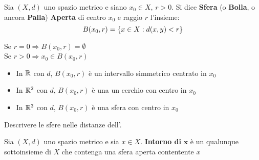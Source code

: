 \begin{definition}[Sfera]
	Sia $(X,d)$ uno spazio metrico e siano $x_0 \in X$, $r > 0$. Si dice \textbf{Sfera} (o \textbf{Bolla}, o ancora \textbf{Palla}) \textbf{Aperta} di centro $x_0$ e raggio $r$ l'insieme:
	\[B(x_0,r)=\left\{x\in X : d(x,y)<r\right\}\]
\end{definition}
\begin{observation}
	Se $r=0\Rightarrow B(x_0,r)=\emptyset$\\
	Se $r>0\Rightarrow x_0\in B(x_0,r)$
\end{observation}
\begin{example}\leavevmode\vspace*{-\baselineskip}
	\begin{itemize}
		\item In $\mathbb{R}$ con $d$, $B(x_0,r)$ è un intervallo simmetrico centrato in $x_0$
		\item In $\mathbb{R}^2$ con $d$, $B(x_0,r)$ è una un cerchio con centro in $x_0$
		\item In $\mathbb{R}^3$ con $d$, $B(x_0,r)$ è una sfera con centro in $x_0$
	\end{itemize}
\end{example}
\begin{exercise}
	Descrivere le sfere nelle distanze dell'.
\end{exercise}

\begin{definition}[Intorno]
	Sia $(X,d)$ uno spazio metrico e sia $x \in X$. \textbf{Intorno di} $\boldsymbol{x}$ è un qualunque sottoinsieme di $X$ che contenga una sfera aperta contentente $x$
\end{definition}

